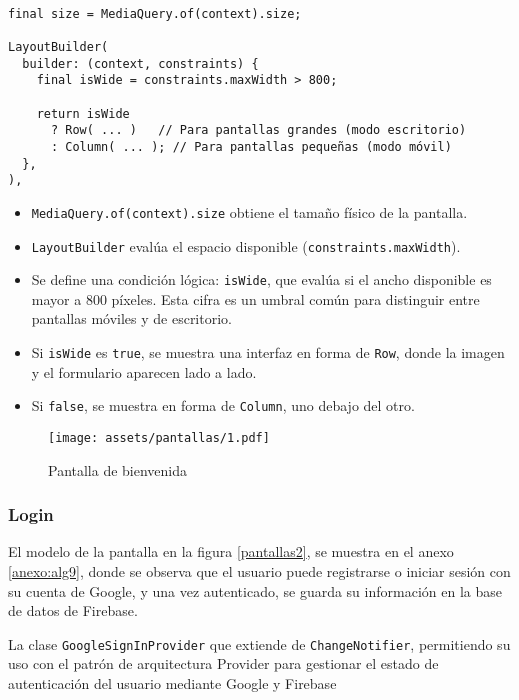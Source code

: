 \begin{verbatim}

final size = MediaQuery.of(context).size;

LayoutBuilder(
  builder: (context, constraints) {
    final isWide = constraints.maxWidth > 800;

    return isWide
      ? Row( ... )   // Para pantallas grandes (modo escritorio)
      : Column( ... ); // Para pantallas pequeñas (modo móvil)
  },
),
\end{verbatim}



\begin{itemize}
    \item \texttt{MediaQuery.of(context).size} obtiene el tamaño físico de la pantalla.
    \item \texttt{LayoutBuilder} evalúa el espacio disponible (\texttt{constraints.maxWidth}).
    \item Se define una condición lógica: \texttt{isWide}, que evalúa si el ancho disponible es mayor a 800 píxeles. Esta cifra es un umbral común para distinguir entre pantallas móviles y de escritorio.
    \item Si \texttt{isWide} es \texttt{true}, se muestra una interfaz en forma de \texttt{Row}, donde la imagen y el formulario aparecen lado a lado.
    \item Si \texttt{false}, se muestra en forma de \texttt{Column}, uno debajo del otro.
\end{itemize}

\begin{figure}[h!]
\centering
  \texttt{[image: assets/pantallas/1.pdf]}
  \caption{Pantalla de bienvenida}
  \label{pantallas1}
\end{figure}

\newpage
\subsubsection*{Login}
El modelo de la pantalla en la figura \ref{pantallas2}, se muestra en el anexo \ref{anexo:alg9}, donde se observa que el usuario puede registrarse o iniciar sesión con su cuenta de Google, y una vez autenticado, se guarda su información en la base de datos de Firebase.


La clase \texttt{GoogleSignInProvider} que extiende de \texttt{ChangeNotifier}, permitiendo su uso con el patrón de arquitectura Provider para gestionar el estado de autenticación del usuario mediante Google y Firebase

